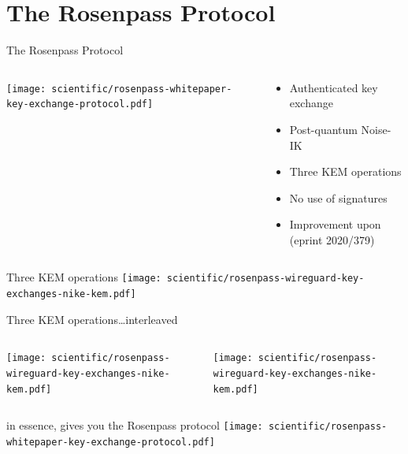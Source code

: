 \section{The Rosenpass Protocol}

\begin{frame}{The Rosenpass Protocol}
  \begin{columns}[fullwidth,c]
    \begin{column}{.5\linewidth}
\texttt{[image: scientific/rosenpass-whitepaper-key-exchange-protocol.pdf]}
    \end{column}

    \begin{column}{.48\linewidth}
      \begin{itemize}
        \item Authenticated key exchange
        \item Post-quantum Noise-IK
        \item Three KEM operations
        \item No use of signatures
        \item Improvement upon  (eprint 2020/379)
      \end{itemize}
    \end{column}
  \end{columns}
\end{frame}

\begin{frame}{Three KEM operations}
  \centering
  \texttt{[image: scientific/rosenpass-wireguard-key-exchanges-nike-kem.pdf]}
\end{frame}

\begin{frame}{Three KEM operations…interleaved}
  \begin{columns}[fullwidth,c]
    \begin{column}{.30\linewidth}
      \texttt{[image: scientific/rosenpass-wireguard-key-exchanges-nike-kem.pdf]}
    \end{column}
    \begin{column}{.45\linewidth}
      \texttt{[image: scientific/rosenpass-wireguard-key-exchanges-nike-kem.pdf]}
    \end{column}
  \end{columns}
\end{frame}

\begin{frame}{in essence, gives you the Rosenpass protocol}
  \centering
  \texttt{[image: scientific/rosenpass-whitepaper-key-exchange-protocol.pdf]}
\end{frame}

